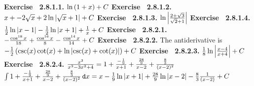  {\noindent \protect \bf  Exercise ~2.8.1.1.} $\protect \qopname  \relax o{ln}\left (1+x\right )+C$ \protect \newline  \protect \newline  
 {\noindent \protect \bf  Exercise ~2.8.1.2.} $x+ -2\protect \sqrt  {x}+2\protect \qopname  \relax o{ln}{|\protect \sqrt  {x}+1|}+C$ \protect \newline  \protect \newline  
 {\noindent \protect \bf  Exercise ~2.8.1.3.} $\protect \qopname  \relax o{ln}\left | \protect \frac  { 2+\protect \sqrt  {3}}{\protect \sqrt  {2} +1} \right |$ \protect \newline  \protect \newline  
 {\noindent \protect \bf  Exercise ~2.8.1.4.} $\protect \frac  {1}{2}\protect \qopname  \relax o{ln}{|x-1|}-\protect \frac  {1}{2}\protect \qopname  \relax o{ln}{|x+1|} +\protect \frac  {1}{x} +C$ \protect \newline  \protect \newline  
 {\noindent \protect \bf  Exercise ~2.8.2.1.} $-\protect \frac  {\protect \qopname  \relax o{cos}^{18}{x}}{18}+ \protect \frac  {\protect \qopname  \relax o{cos}^{16}{x}}{8} - \protect \frac  {\protect \qopname  \relax o{cos}^{14}{x}}{14} + C$ \protect \newline  \protect \newline  
 {\noindent \protect \bf  Exercise ~2.8.2.2.} The antiderivative is $-\protect \frac  {1}{2}\left (\protect \qopname  \relax o{csc}(x)\protect \qopname  \relax o{cot}(x)+\protect \qopname  \relax o{ln}\left |\protect \qopname  \relax o{csc}(x)+\protect \qopname  \relax o{cot}(x)\right |\right )+C$ \protect \newline  \protect \newline  
 {\noindent \protect \bf  Exercise ~2.8.2.3.} $\protect \frac  {1}{8} \protect \qopname  \relax o{ln}\left | \protect \frac  {x-4}{x+4} \right | + C$ \protect \newline  \protect \newline  
 {\noindent \protect \bf  Exercise ~2.8.2.4.} \textbullet $ \protect \frac  {x^3}{x^3-3x^2+4} = 1 + \protect \frac  { -\protect \frac  {1}{9}}{x+1} + \protect \frac  {\protect \frac  {28}{9}}{x-2} + \protect \frac  {\protect \frac  {8}{3}}{(x-2)^2} $ \protect \newline  \textbullet $ \intop {1 + \protect \frac  { -\protect \frac  {1}{9}}{x+1} + \protect \frac  {\protect \frac  {28}{9}}{x-2} + \protect \frac  {\protect \frac  {8}{3}}{(x-2)^2} \mathop {}\protect \tmspace  -\thinmuskip {.1667em}\protect \mathtt  {d}x} = x -\protect \frac  {1}{9} \protect \qopname  \relax o{ln}{|x+1|} + \protect \frac  {28}{9} \protect \qopname  \relax o{ln}{|x-2|} - \protect \frac  {8}{3} \protect \frac  {1}{(x-2)} + C$  \protect \newline  \protect \newline  
